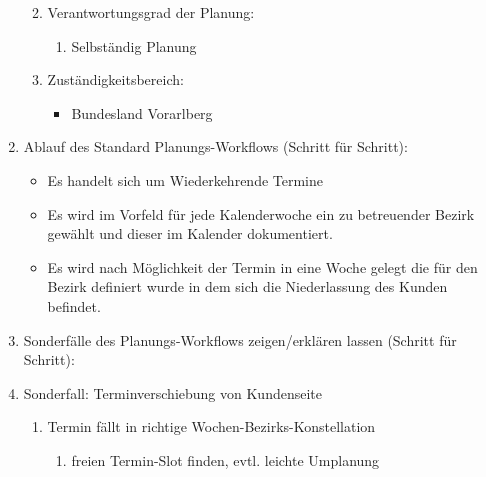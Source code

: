 \documentclass[Bachelorarbeit.tex]{subfiles}
\begin{document}
\begin{enumerate}
\begin{enumerate}
\begin{itemize}
		\end{itemize}
		\item Verantwortungsgrad der Planung:
		\begin{enumerate}
			\item[] Selbständig Planung
		\end{enumerate}
		\item Zuständigkeitsbereich:
		\begin{itemize}
			\item[] Bundesland Vorarlberg
		\end{itemize}
	\end{enumerate}
	\item Ablauf des Standard Planungs-Workflows (Schritt für Schritt):
	\begin{itemize}
		\item Es handelt sich um Wiederkehrende Termine
		\item Es wird im Vorfeld für jede Kalenderwoche ein zu betreuender Bezirk gewählt und dieser im Kalender dokumentiert.
		\item Es wird nach Möglichkeit der Termin in eine Woche gelegt die für den Bezirk definiert wurde in dem sich die Niederlassung des Kunden befindet.
	\end{itemize}
	\item Sonderfälle des Planungs-Workflows zeigen/erklären lassen (Schritt für Schritt):
	\item[] Sonderfall: Terminverschiebung von Kundenseite
	\label{interview1:sonderfall}
	\begin{enumerate}
		\item Termin fällt in richtige Wochen-Bezirks-Konstellation
		\label{interview1:sonderfall_optimal}
		\begin{enumerate}
			\item freien Termin-Slot finden, evtl. leichte Umplanung
			

\end{enumerate}
\end{enumerate}
\end{enumerate}
\end{document}
